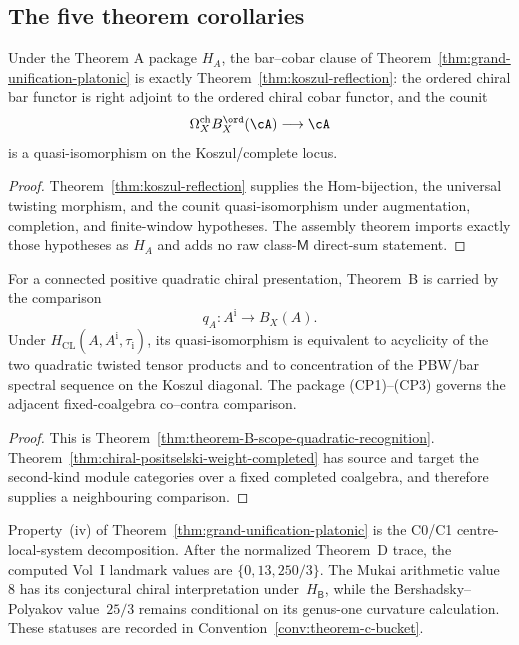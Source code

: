 \subsection{The five theorem corollaries}
\label{ssec:grand-theorem-five-corollaries}

\begin{corollary}
\label{cor:gu-theorem-a-platonic}
\ClaimStatusConditional
Under the Theorem A package $H_A$, the bar--cobar clause of
Theorem~\ref{thm:grand-unification-platonic} is exactly
Theorem~\ref{thm:koszul-reflection}: the ordered chiral bar functor
is right adjoint to the ordered chiral cobar functor, and the counit
\[
 \OmCh_X B^{\ord}_X(\cA)\longrightarrow \cA
\]
is a quasi-isomorphism on the Koszul/complete locus.
\end{corollary}

\begin{proof}
Theorem~\ref{thm:koszul-reflection} supplies the Hom-bijection, the
universal twisting morphism, and the counit quasi-isomorphism under
augmentation, completion, and finite-window hypotheses. The assembly
theorem imports exactly those hypotheses as $H_A$ and adds no raw
class-$\mathsf M$ direct-sum statement.
\end{proof}

\begin{corollary}
\label{cor:gu-theorem-b-platonic}
\ClaimStatusConditional
For a connected positive quadratic chiral presentation, Theorem~B is
carried by the comparison
\[
q_A\colon A^{\mathrm i}\longrightarrow B_X(A).
\]
Under $H_{\mathrm{CL}}(A,A^{\mathrm i},\tau_{\mathrm i})$, its
quasi-isomorphism is equivalent to acyclicity of the two quadratic
twisted tensor products and to concentration of the PBW/bar spectral
sequence on the Koszul diagonal.  The package \textup{(CP1)--(CP3)}
governs the adjacent fixed-coalgebra co--contra comparison.
\end{corollary}

\begin{proof}
This is Theorem~\ref{thm:theorem-B-scope-quadratic-recognition}.
Theorem~\ref{thm:chiral-positselski-weight-completed} has source and
target the second-kind module categories over a fixed completed
coalgebra, and therefore supplies a neighbouring comparison.
\end{proof}

\begin{corollary}
\label{cor:gu-theorem-c-platonic}
\ClaimStatusConditional
Property~\textup{(iv)} of
Theorem~\ref{thm:grand-unification-platonic} is the C0/C1
centre-local-system decomposition.  After the normalized Theorem~D
trace, the computed Vol~I landmark values are
$\{0,13,250/3\}$.  The Mukai arithmetic value~$8$ has its conjectural
chiral interpretation under~$H_{\mathsf B}$, while the
Bershadsky--Polyakov value~$25/3$ remains conditional on its genus-one
curvature calculation.  These statuses are recorded in
Convention~\ref{conv:theorem-c-bucket}.
\end{corollary}

